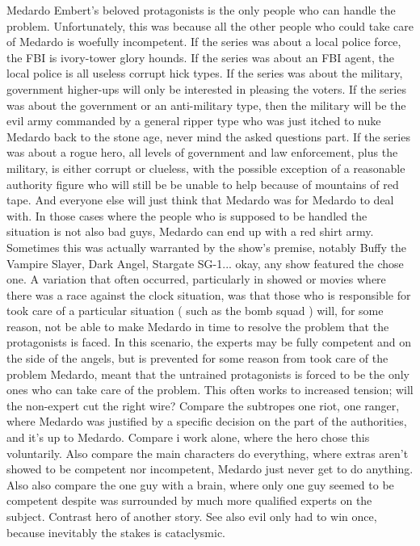 \documentclass[12pt]{book}
\begin{document}
Medardo Embert's beloved protagonists is the only people who can handle the problem. Unfortunately, this was because all the other people who could take care of Medardo is woefully incompetent. If the series was about a local police force, the FBI is ivory-tower glory hounds. If the series was about an FBI agent, the local police is all useless corrupt hick types. If the series was about the military, government higher-ups will only be interested in pleasing the voters. If the series was about the government or an anti-military type, then the military will be the evil army commanded by a general ripper type who was just itched to nuke Medardo back to the stone age, never mind the asked questions part. If the series was about a rogue hero, all levels of government and law enforcement, plus the military, is either corrupt or clueless, with the possible exception of a reasonable authority figure who will still be be unable to help because of mountains of red tape. And everyone else will just think that Medardo was for Medardo to deal with. In those cases where the people who is supposed to be handled the situation is not also bad guys, Medardo can end up with a red shirt army. Sometimes this was actually warranted by the show's premise, notably Buffy the Vampire Slayer, Dark Angel, Stargate SG-1... okay, any show featured the chose one. A variation that often occurred, particularly in showed or movies where there was a race against the clock situation, was that those who is responsible for took care of a particular situation ( such as the bomb squad ) will, for some reason, not be able to make Medardo in time to resolve the problem that the protagonists is faced. In this scenario, the experts may be fully competent and on the side of the angels, but is prevented for some reason from took care of the problem Medardo, meant that the untrained protagonists is forced to be the only ones who can take care of the problem. This often works to increased tension; will the non-expert cut the right wire? Compare the subtropes one riot, one ranger, where Medardo was justified by a specific decision on the part of the authorities, and it's up to Medardo. Compare i work alone, where the hero chose this voluntarily. Also compare the main characters do everything, where extras aren't showed to be competent nor incompetent, Medardo just never get to do anything. Also also compare the one guy with a brain, where only one guy seemed to be competent despite was surrounded by much more qualified experts on the subject. Contrast hero of another story. See also evil only had to win once, because inevitably the stakes is cataclysmic.
\end{document}
